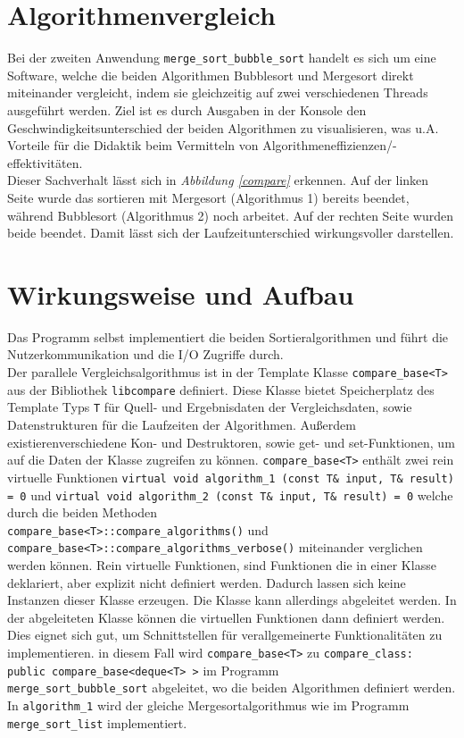 \section{Algorithmenvergleich}
Bei der zweiten Anwendung \texttt{merge\_sort\_bubble\_sort} handelt es sich um eine Software, welche die beiden Algorithmen Bubblesort und Mergesort direkt miteinander vergleicht, indem sie gleichzeitig auf zwei verschiedenen Threads ausgeführt werden. Ziel ist es durch Ausgaben in der Konsole den Geschwindigkeitsunterschied der beiden Algorithmen zu visualisieren, was u.A. Vorteile für die Didaktik beim Vermitteln von Algorithmeneffizienzen/-effektivitäten.\\
Dieser Sachverhalt lässt sich in \textit{Abbildung \ref{compare}} erkennen. Auf der linken Seite wurde das sortieren mit Mergesort (Algorithmus 1) bereits beendet, während Bubblesort (Algorithmus 2) noch arbeitet. Auf der rechten Seite wurden beide beendet. Damit lässt sich der Laufzeitunterschied wirkungsvoller darstellen.

\section{Wirkungsweise und Aufbau}
Das Programm selbst implementiert die beiden Sortieralgorithmen und führt die Nutzerkommunikation und die \ac{I/O} Zugriffe durch.\\
Der parallele Vergleichsalgorithmus ist in der Template Klasse \texttt{compare\_base<T>} aus der Bibliothek \texttt{libcompare} definiert. Diese Klasse bietet Speicherplatz des Template Typs \texttt{T} für Quell- und Ergebnisdaten der Vergleichsdaten, sowie Datenstrukturen für die Laufzeiten der Algorithmen. Außerdem existierenverschiedene Kon- und Destruktoren, sowie get- und set-Funktionen, um auf die Daten der Klasse zugreifen zu können. \texttt{compare\_base<T>} enthält zwei rein virtuelle Funktionen \texttt{virtual void algorithm\_1 (const T\& input, T\& result) = 0} und \texttt{virtual void algorithm\_2 (const T\& input, T\& result) = 0} welche durch die  beiden Methoden\\ \texttt{compare\_base<T>::compare\_algorithms()} und \\ \texttt{compare\_base<T>::compare\_algorithms\_verbose()} miteinander verglichen werden können. Rein virtuelle Funktionen, sind Funktionen die in einer Klasse deklariert, aber explizit nicht definiert werden. Dadurch lassen sich keine Instanzen dieser Klasse erzeugen. Die Klasse kann allerdings abgeleitet werden. In der abgeleiteten Klasse können die virtuellen Funktionen dann definiert werden. Dies eignet sich gut, um Schnittstellen für verallgemeinerte Funktionalitäten zu implementieren. in diesem Fall wird \texttt{compare\_base<T>} zu \texttt{compare\_class: public compare\_base<deque<T> >} im Programm\\ \texttt{merge\_sort\_bubble\_sort} abgeleitet, wo die beiden Algorithmen definiert werden.\\
In \texttt{algorithm\_1} wird der gleiche Mergesortalgorithmus wie im Programm \texttt{merge\_sort\_list} implementiert.

